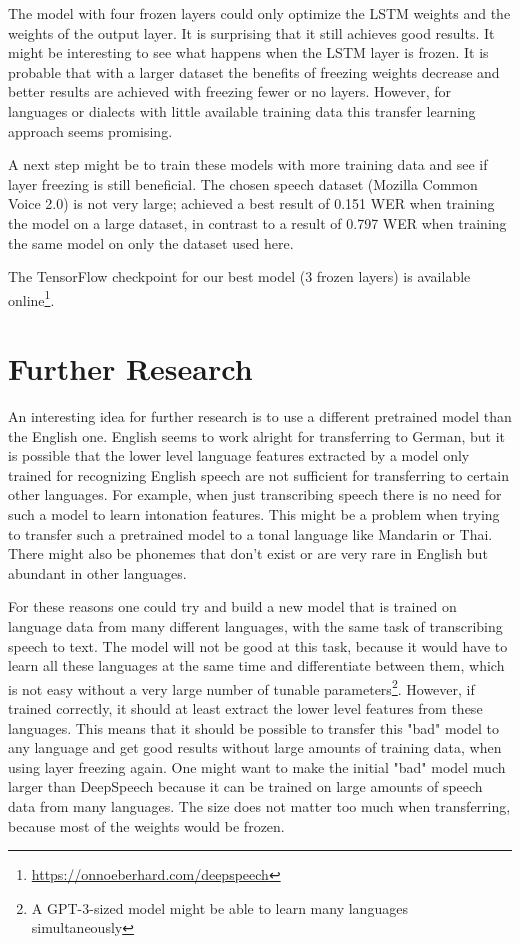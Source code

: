 \documentclass[12pt]{article}    %
\begin{document}
The model with four frozen layers could only optimize the LSTM weights and the weights of the output layer. It is surprising that it still achieves good results. It might be interesting to see what happens when the LSTM layer is frozen. It is probable that with a larger dataset the benefits of freezing weights decrease and better results are achieved with freezing fewer or no layers. However, for languages or dialects with little available training data this transfer learning approach seems promising.

A next step might be to train these models with more training data and see if layer freezing is still beneficial. The chosen speech dataset (Mozilla Common Voice 2.0) is not very large; \textcite{agarwal-zesch-2019-german} achieved a best result of 0.151 WER when training the model on a large dataset, in contrast to a result of 0.797 WER when training the same model on only the dataset used here.

The TensorFlow checkpoint for our best model (3 frozen layers) is available online\footnote{\url{https://onnoeberhard.com/deepspeech}}.

\section{Further Research}
An interesting idea for further research is to use a different pretrained model than the English one. English seems to work alright for transferring to German, but it is possible that the lower level language features extracted by a model only trained for recognizing English speech are not sufficient for transferring to certain other languages. For example, when just transcribing speech there is no need for such a model to learn intonation features. This might be a problem when trying to transfer such a pretrained model to a tonal language like Mandarin or Thai. There might also be phonemes that don't exist or are very rare in English but abundant in other languages. 

For these reasons one could try and build a new model that is trained on language data from many different languages, with the same task of transcribing speech to text. The model will not be good at this task, because it would have to learn all these languages at the same time and differentiate between them, which is not easy without a very large number of tunable parameters\footnote{A GPT-3-sized \parencite{brown2020language} model might be able to learn many languages simultaneously}. However, if trained correctly, it should at least extract the lower level features from these languages. This means that it should be possible to transfer this "bad" model to any language and get good results without large amounts of training data, when using layer freezing again. One might want to make the initial "bad" model much larger than DeepSpeech because it can be trained on large amounts of speech data from many languages. The size does not matter too much when transferring, because most of the weights would be frozen.
\end{document}
